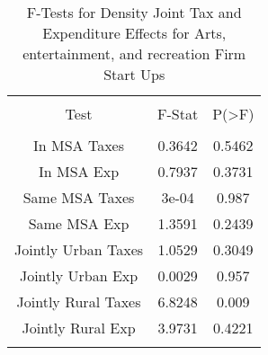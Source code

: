 
\begin{table}[!htbp] \centering 
  \caption{F-Tests for Density Joint Tax and Expenditure Effects for Arts, entertainment, and recreation Firm Start Ups} 
  \label{71Ftests} 
\begin{tabular}{@{\extracolsep{5pt}} ccc} 
\\[-1.8ex]\hline 
\hline \\[-1.8ex] 
Test & F-Stat & P(\textgreater F) \\ 
\hline \\[-1.8ex] 
In MSA Taxes & 0.3642 & 0.5462 \\ 
In MSA Exp & 0.7937 & 0.3731 \\ 
Same MSA Taxes & 3e-04 & 0.987 \\ 
Same MSA Exp & 1.3591 & 0.2439 \\ 
Jointly Urban Taxes & 1.0529 & 0.3049 \\ 
Jointly Urban Exp & 0.0029 & 0.957 \\ 
Jointly Rural Taxes & 6.8248 & 0.009 \\ 
Jointly Rural Exp & 3.9731 & 0.4221 \\ 
\hline \\[-1.8ex] 
\end{tabular} 
\end{table} 
